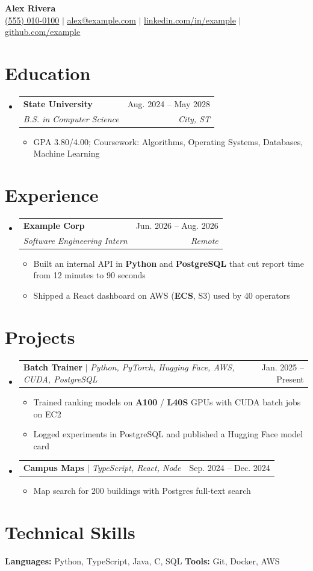 \documentclass[letterpaper,11pt]{article}
\makeatletter
\newcommand{\resumeSubheading}[4]{
  \item
    \begin{tabular*}{\textwidth}[t]{l@{\extracolsep{\fill}}r}
      \textbf{#1} & #2 \\
      \textit{\small#3} & \textit{\small #4} \\[2pt]
    \end{tabular*}
}
\newcommand{\resumeProjectHeading}[2]{
    \item
    \begin{tabular*}{\textwidth}[t]{l@{\extracolsep{\fill}}r}
      \small#1 & #2 \\[2pt]
    \end{tabular*}
}
\newcommand{\resumeItem}[1]{\item\small{#1}}
\newcommand{\resumeSubHeadingListStart}{%
  \begin{itemize}[leftmargin=0in, label={}, itemsep=6pt, parsep=0pt, topsep=0pt, partopsep=0pt]}
\newcommand{\resumeSubHeadingListEnd}{\end{itemize}}
\newcommand{\resumeItemListStart}{%
  \begin{itemize}[leftmargin=0.2in, labelsep=0.5em, topsep=0pt, itemsep=2pt, parsep=0pt, partopsep=0pt]}
\newcommand{\resumeItemListEnd}{\end{itemize}}
\makeatother
\begin{document}
\begin{center}
    \textbf{\Huge Alex Rivera} \\[7pt]
    \small
    \href{tel:5550100}{\underline{(555) 010-0100}} $|$
    \href{mailto:alex@example.com}{\underline{alex@example.com}} $|$
    \href{https://linkedin.com/in/example}{\underline{linkedin.com/in/example}} $|$
    \href{https://github.com/example}{\underline{github.com/example}}
\end{center}

\section{Education}
  \resumeSubHeadingListStart
    \resumeSubheading
      {State University}{Aug. 2024 -- May 2028}
      {B.S. in Computer Science}{City, ST}
      \resumeItemListStart
        \resumeItem{GPA 3.80/4.00; Coursework: Algorithms, Operating Systems, Databases, Machine Learning}
      \resumeItemListEnd
    \iftoggle{showhighschool}{
    \resumeSubheading
      {City High School}{Sep. 2020 -- Jun. 2024}
      {High School Diploma}{City, ST}
    }{}
  \resumeSubHeadingListEnd

\section{Experience}
  \resumeSubHeadingListStart
    \resumeSubheading
      {Example Corp}{Jun. 2026 -- Aug. 2026}
      {Software Engineering Intern}{Remote}
      \resumeItemListStart
        \resumeItem{Built an internal API in \textbf{Python} and \textbf{PostgreSQL} that cut report time from 12 minutes to 90 seconds}
        \resumeItem{Shipped a React dashboard on AWS (\textbf{ECS}, S3) used by 40 operators}
      \resumeItemListEnd
  \resumeSubHeadingListEnd

\section{Projects}
  \resumeSubHeadingListStart
    \resumeProjectHeading
      {\textbf{Batch Trainer} $|$ \emph{Python, PyTorch, Hugging Face, AWS, CUDA, PostgreSQL}}{Jan. 2025 -- Present}
      \resumeItemListStart
        \resumeItem{Trained ranking models on \textbf{A100} / \textbf{L40S} GPUs with CUDA batch jobs on EC2}
        \resumeItem{Logged experiments in PostgreSQL and published a Hugging Face model card}
      \resumeItemListEnd
    \resumeProjectHeading
      {\textbf{Campus Maps} $|$ \emph{TypeScript, React, Node}}{Sep. 2024 -- Dec. 2024}
      \resumeItemListStart
        \resumeItem{Map search for 200 buildings with Postgres full-text search}
      \resumeItemListEnd
  \resumeSubHeadingListEnd

\section{Technical Skills}
  \resumeSubHeadingListStart
    \small{\item{
      \textbf{Languages:} Python, TypeScript, Java, C, SQL
      \textbf{Tools:} Git, Docker, AWS\iftoggle{showiac}{, Terraform}{}\iftoggle{showskillextra}{, Hugging Face, CUDA}{}\iftoggle{showotel}{, Prometheus, Grafana}{}
    }}
  \resumeSubHeadingListEnd
\end{document}
